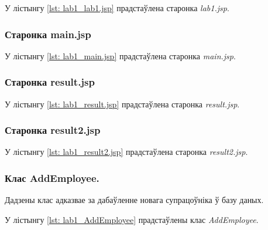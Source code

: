 У лістынгу \ref{lst: lab1_lab1.jsp} прадстаўлена старонка 
\textit{lab1.jsp}.



\subsubsection{Старонка main.jsp}

У лістынгу \ref{lst: lab1_main.jsp} прадстаўлена старонка 
\textit{main.jsp}.



\subsubsection{Старонка result.jsp}

У лістынгу \ref{lst: lab1_result.jsp} прадстаўлена старонка 
\textit{result.jsp}.



\subsubsection{Старонка result2.jsp}

У лістынгу \ref{lst: lab1_result2.jsp} прадстаўлена старонка 
\textit{result2.jsp}.



\subsubsection{Клас AddEmployee.}

Дадзены клас адказвае за дабаўленне новага супрацоўніка ў базу даных.

У лістынгу \ref{lst: lab1_AddEmployee} прадстаўлены клас
\textit{AddEmployee}.



